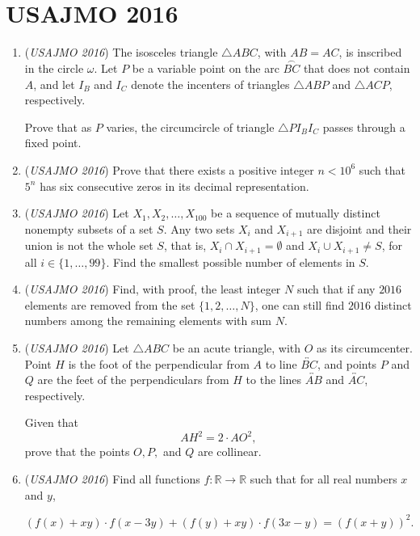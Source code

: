 \section{USAJMO 2016}
        \begin{enumerate}
        	\item (\textit{USAJMO 2016}) The isosceles triangle $\triangle ABC$, with $AB=AC$, is inscribed in the circle $\omega$. Let $P$ be a variable point on the arc $\stackrel{\frown}{BC}$ that does not contain $A$, and let $I_B$ and $I_C$ denote the incenters of triangles $\triangle ABP$ and $\triangle ACP$, respectively.


 Prove that as $P$ varies, the circumcircle of triangle $\triangle PI_BI_C$ passes through a fixed point.


 

	\item (\textit{USAJMO 2016}) Prove that there exists a positive integer $n < 10^6$ such that $5^n$ has six consecutive zeros in its decimal representation.


 

	\item (\textit{USAJMO 2016}) Let $X_1, X_2, \ldots, X_{100}$ be a sequence of mutually distinct nonempty subsets of a set $S$. Any two sets $X_i$ and $X_{i+1}$ are disjoint and their union is not the whole set $S$, that is, $X_i\cap X_{i+1}=\emptyset$ and $X_i\cup X_{i+1}\neq S$, for all $i\in\{1, \ldots, 99\}$. Find the smallest possible number of elements in $S$.


 

	\item (\textit{USAJMO 2016}) Find, with proof, the least integer $N$ such that if any $2016$ elements are removed from the set $\{1, 2,\dots,N\}$, one can still find $2016$ distinct numbers among the remaining elements with sum $N$.


 

	\item (\textit{USAJMO 2016}) Let $\triangle ABC$ be an acute triangle, with $O$ as its circumcenter. Point $H$ is the foot of the perpendicular from $A$ to line $\overleftrightarrow{BC}$, and points $P$ and $Q$ are the feet of the perpendiculars from $H$ to the lines $\overleftrightarrow{AB}$ and $\overleftrightarrow{AC}$, respectively.


 Given that 
 \[AH^2=2\cdot AO^2,\]prove that the points $O,P,$ and $Q$ are collinear.


 

	\item (\textit{USAJMO 2016}) Find all functions $f:\mathbb{R}\rightarrow \mathbb{R}$ such that for all real numbers $x$ and $y$,

 \[(f(x)+xy)\cdot f(x-3y)+(f(y)+xy)\cdot f(3x-y)=(f(x+y))^2.\]


\end{enumerate}